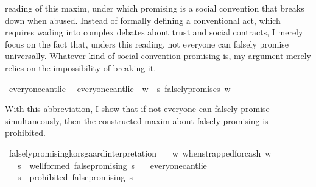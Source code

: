 \begin{isabellebody}
\begin{isamarkuptext}
reading of this maxim, under which promising is a social convention that breaks down when abused. Instead
of formally defining a conventional act, which requires wading into complex debates about trust and 
social contracts, I merely focus on the fact that, unders this reading, not everyone can falsely 
promise universally. Whatever kind of social convention promising is, my argument merely relies on
the impossibility of breaking it.%
\end{isamarkuptext}\isamarkuptrue%
\isamarkupfalse%
\ everyone{\isacharunderscore}can{\isacharprime}t{\isacharunderscore}lie\ \ \isanewline
{\isachardoublequoteopen}everyone{\isacharunderscore}can{\isacharprime}t{\isacharunderscore}lie\ {\isasymequiv}\ {\isasymforall}w{\isachardot}\ {\isasymnot}\ {\isacharparenleft}{\isasymforall}s{\isachardot}\ falsely{\isacharunderscore}promise{\isacharparenleft}s{\isacharparenright}\ w{\isacharparenright}\ {\isachardoublequoteclose}\isanewline
%
%
\begin{isamarkuptext}%
With this abbreviation, I show that if not everyone can falsely promise simultaneously, then
the constructed maxim about falsely promising is prohibited.%
\end{isamarkuptext}\isamarkuptrue%
\isamarkupfalse%
\ falsely{\isacharunderscore}promising{\isacharunderscore}korsgaard{\isacharunderscore}interpretation{\isacharcolon}\isanewline
\ \ \ {\isachardoublequoteopen}{\isasymforall}w{\isachardot}\ when{\isacharunderscore}strapped{\isacharunderscore}for{\isacharunderscore}cash\ w{\isachardoublequoteclose}\isanewline
%
\isanewline
\ \ \ {\isachardoublequoteopen}{\isasymforall}s{\isachardot}\ {\isasymTurnstile}\ {\isacharparenleft}well{\isacharunderscore}formed\ false{\isacharunderscore}promising\ s{\isacharparenright}{\isachardoublequoteclose}\isanewline
%
\isanewline
\ \ \ everyone{\isacharunderscore}can{\isacharprime}t{\isacharunderscore}lie\isanewline
%
\isanewline
\ \ \ {\isachardoublequoteopen}{\isasymforall}s{\isachardot}\ {\isasymTurnstile}\ {\isacharparenleft}prohibited\ false{\isacharunderscore}promising\ s{\isacharparenright}{\isachardoublequoteclose}\isanewline

\end{isabellebody}
